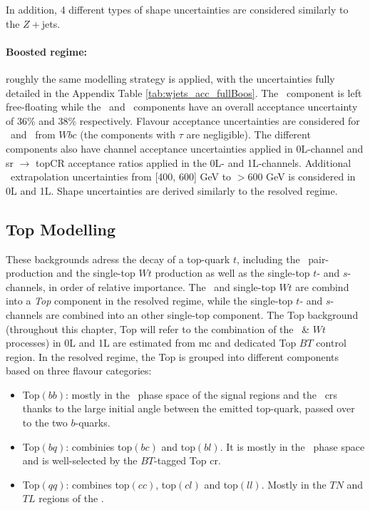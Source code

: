 In addition, 4 different types of shape uncertainties are considered similarly to the $Z+$jets.

\paragraph{Boosted regime:} roughly the same modelling strategy is applied, with the uncertainties fully detailed in the Appendix Table \ref{tab:wjets_acc_fullBoos}. The \whf\ component is left free-floating while the \wmf\ and \wlf\ components have an overall acceptance uncertainty of 36\% and 38\% respectively. Flavour acceptance uncertainties are considered for \whf\ and \wmf\ from $Wbc$ (the components with $\tau$ are negligible). The different components also have channel acceptance uncertainties applied in 0L-channel and \gls{sr} $\rightarrow$ topCR acceptance ratios applied in the 0L- and 1L-channels. Additional \ptv\ extrapolation uncertainties from [400, 600] GeV to $> 600$ GeV is considered in 0L and 1L. Shape uncertainties are derived similarly to the resolved regime. 

\subsection{Top Modelling}\label{sec-modTop} 
These backgrounds adress the decay of a top-quark $t$, including the \ttb\ pair-production and the single-top $Wt$ production as well as the single-top $t$- and $s$-channels, in order of relative importance. The \ttb\ and single-top $Wt$ are combind into a \textit{Top} component in the resolved regime, while the single-top $t$- and $s$-channels are combined into an other single-top component. The Top background (throughout this chapter, Top will refer to the combination of the \ttb\ \& $Wt$ processes) in 0L and 1L are estimated from \gls{mc} and dedicated Top $BT$ control region. In the resolved regime, the Top is grouped into different components based on three flavour categories:
\begin{itemize}
    \item Top$(bb)$: mostly in the \vhb\ phase space of the signal regions and the \highdr\ \gls{cr}s thanks to the large initial angle between the emitted top-quark, passed over to the two $b$-quarks.
    \item Top$(bq)$: combinies top$(bc)$ and top$(bl)$. It is mostly in the \vhc\ phase space and is well-selected by the $BT$-tagged Top \gls{cr}.
    \item Top$(qq)$: combines top$(cc)$, top$(cl)$ and top$(ll)$. Mostly in the $TN$ and $TL$ regions of the \vhc.
\end{itemize}

